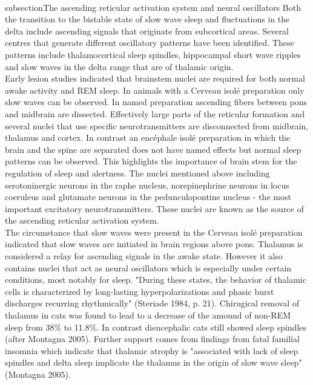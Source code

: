 
\\subsection{The ascending reticular activation system and neural oscillators}
Both the transition to the bistable state of slow wave sleep and fluctuations in the delta include ascending signals that originate from subcortical areas. Several centres that generate different oscillatory patterns have been identified. These patterns include thalamocortical sleep spindles, hippocampal short wave ripples and slow waves in the delta range that are of thalamic origin.\\
Early lesion studies indicated that brainstem nuclei are required for both normal awake activity and REM sleep. In animals with a Cerveau isolé preparation only slow waves can be observed. In named preparation ascending fibers between pons and midbrain are dissected. Effectively large parts of the reticular formation and several nuclei that use specific neurotransmitters are disconnected from midbrain, thalamus and cortex. In contrast an encéphale isolé preparation in which the brain and the spine are separated does not have named effects but normal sleep patterns can be observed. This highlights the importance of brain stem for the regulation of sleep and alertness. The nuclei mentioned above including serotoninergic neurons in the raphe nucleus, norepinephrine neurons in locus coeruleus and glutamate neurons in the pedunculopontine nucleus - the most important excitatory neurotransmitters. These nuclei are known as the source of the ascending reticular activation system.\\
The circumstance that slow waves were present in the Cerveau isolé preparation indicated that slow waves are initiated in brain regions above pons. Thalamus is considered a relay for ascending signals in the awake state. However it also contains nuclei that act as neural oscillators which is especially under certain conditions, most notably for sleep. "During these states, the behavior of thalamic cells is characterized by long-lasting hyperpolarizations and phasic burst discharges recurring rhythmically" (Steriade 1984, p. 21). Chirugical removal of thalamus in cats was found to lead to a decrease of the amound of non-REM sleep from 38\% to 11.8\%. In contrast diencephalic cats still showed sleep spindles (after Montagna 2005). Further support comes from findings from fatal familial insomnia which indicate that thalamic atrophy is "associated with lack of sleep spindles and delta sleep implicate the thalamus in the origin of slow wave sleep"(Montagna 2005).
